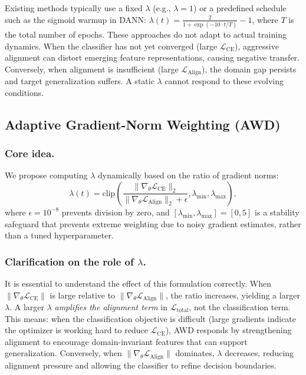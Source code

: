 \documentclass[pdflatex,sn-mathphys-num]{sn-jnl}
\theoremstyle{thmstyleone}
\theoremstyle{thmstyletwo}
\theoremstyle{thmstylethree}
\begin{document}
Existing methods typically use a fixed $\lambda$ (e.g., $\lambda = 1$) or a predefined schedule such as the sigmoid warmup in DANN: $\lambda(t) = \frac{2}{1 + \exp(-10 \cdot t/T)} - 1$, where $T$ is the total number of epochs. These approaches do not adapt to actual training dynamics. When the classifier has not yet converged (large $\mathcal{L}_{\text{CE}}$), aggressive alignment can distort emerging feature representations, causing negative transfer. Conversely, when alignment is insufficient (large $\mathcal{L}_{\text{Align}}$), the domain gap persists and target generalization suffers. A static $\lambda$ cannot respond to these evolving conditions.

\subsection{Adaptive Gradient-Norm Weighting (AWD)}

\subsubsection{Core idea.}
We propose computing $\lambda$ dynamically based on the ratio of gradient norms:
\begin{equation}
\lambda(t) = \mathrm{clip}\left( \frac{\|\nabla_\theta \mathcal{L}_{\text{CE}}\|_2}{\|\nabla_\theta \mathcal{L}_{\text{Align}}\|_2 + \epsilon}, \lambda_{\min}, \lambda_{\max} \right),
\label{eq:adaptive_lambda}
\end{equation}
where $\epsilon = 10^{-8}$ prevents division by zero, and $[\lambda_{\min}, \lambda_{\max}] = [0, 5]$ is a stability safeguard that prevents extreme weighting due to noisy gradient estimates, rather than a tuned hyperparameter.


\subsubsection{Clarification on the role of \texorpdfstring{$\lambda$}{lambda}.}
It is essential to understand the effect of this formulation correctly. When $\|\nabla_\theta \mathcal{L}_{\text{CE}}\|$ is large relative to $\|\nabla_\theta \mathcal{L}_{\text{Align}}\|$, the ratio increases, yielding a larger $\lambda$. A larger $\lambda$ \emph{amplifies the alignment term} in $\mathcal{L}_{\text{total}}$, not the classification term. This means: when the classification objective is difficult (large gradients indicate the optimizer is working hard to reduce $\mathcal{L}_{\text{CE}}$), AWD responds by strengthening alignment to encourage domain-invariant features that can support generalization. Conversely, when $\|\nabla_\theta \mathcal{L}_{\text{Align}}\|$ dominates, $\lambda$ decreases, reducing alignment pressure and allowing the classifier to refine decision boundaries.
\end{document}
